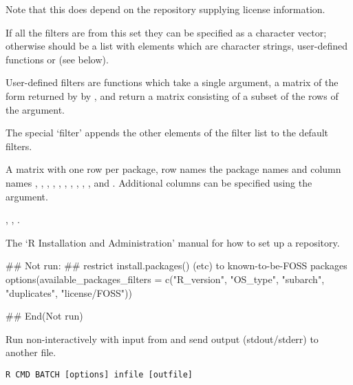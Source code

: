 \begin{Details}
\begin{description}
Note that this does depend on the repository supplying license
information.


\end{description}

If all the filters are from this set they can be specified as a
character vector; otherwise  should be a list with
elements which are character strings, user-defined functions or
 (see below).

User-defined filters are functions which take a single argument, a
matrix of the form returned by by , and
return a matrix consisting of a subset of the rows of the argument.

The special `filter'  appends the other
elements of the filter list to the default filters.
\end{Details}
%
\begin{Value}
A matrix with one row per package, row names the package names and
column names , , ,
, , ,
, , ,
,  and .  Additional
columns can be specified using the  argument.
\end{Value}
%
\begin{SeeAlso}\relax
{}, ,
.

The `R Installation and Administration' manual for how to 
set up a repository.
\end{SeeAlso}
%
\begin{Examples}
\begin{ExampleCode}
## Not run: 
## restrict install.packages() (etc) to known-to-be-FOSS packages
options(available_packages_filters =
  c("R_version", "OS_type", "subarch", "duplicates", "license/FOSS"))


## End(Not run)
\end{ExampleCode}
\end{Examples}
%
\begin{Description}\relax
Run \R{} non-interactively with input from  and
send output (stdout/stderr) to another file.
\end{Description}
%
\begin{Usage}
\begin{verbatim}
R CMD BATCH [options] infile [outfile]
\end{verbatim}
\end{Usage}
